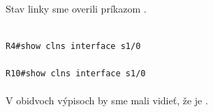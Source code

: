 \documentclass[12pt,twoside,a4paper]{report}
\begin{document}
\paragraph{}
Stav linky sme overili príkazom .

\noindent
{\selectfont
\begin{small}
\begin{verbatim}

R4#show clns interface s1/0

R10#show clns interface s1/0

\end{verbatim}
\end{small}
}

\paragraph{}
V obidvoch výpisoch by sme mali vidieť, že  je .
\end{document}
